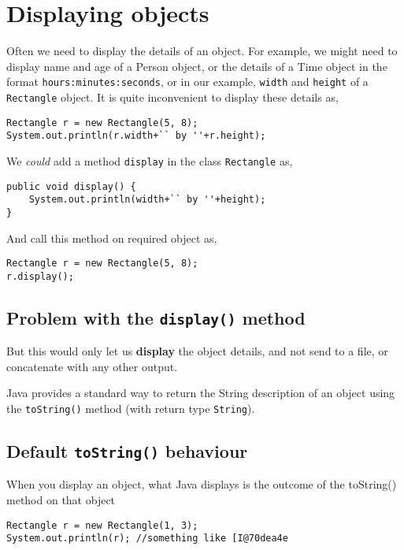 \section{Displaying objects}

Often we need to display the details of an object. For example, we might need to display name and age of a Person object, or the details of a Time object in the format \texttt{hours:minutes:seconds}, or in our example, \texttt{width} and \texttt{height} of a \texttt{Rectangle} object. It is quite inconvenient to display these details as,

\begin{lstlisting}
Rectangle r = new Rectangle(5, 8);
System.out.println(r.width+`` by ''+r.height);
\end{lstlisting}

We \emph{could} add a method \texttt{display} in the class \texttt{Rectangle} as,

\begin{lstlisting}
public void display() {
    System.out.println(width+`` by ''+height);
}
\end{lstlisting}

And call this method on required object as,

\begin{lstlisting}
Rectangle r = new Rectangle(5, 8);
r.display();
\end{lstlisting}

\subsection{Problem with the \texttt{display()} method}

But this would only let us \textbf{display} the object details, and not send to a file, or concatenate with any other output. 

Java provides a standard way to return the String description of an object using the \texttt{toString()} method (with return type \texttt{String}). 

\subsection{Default \texttt{toString()} behaviour}

When you display an object, what Java displays is the outcome of the {toString()} method on that object
\begin{lstlisting}
Rectangle r = new Rectangle(1, 3);
System.out.println(r); //something like [I@70dea4e
\end{lstlisting}

